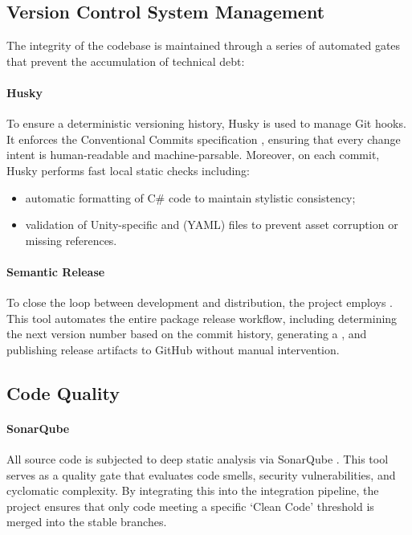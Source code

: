 \subsection{Version Control System Management}

The integrity of the codebase is maintained through a series of automated gates that prevent the accumulation of technical debt:

\paragraph{Husky}
To ensure a deterministic versioning history, Husky \cite{husky} is used to manage Git hooks. It enforces the Conventional Commits specification \cite{conventionalcommits}, ensuring that every change intent is human-readable and machine-parsable. Moreover, on each commit, Husky performs fast local static checks including:

\begin{itemize}
	\item automatic formatting of C\# code to maintain stylistic consistency;
	\item validation of Unity-specific  and  (YAML) files to prevent asset corruption or missing references.
\end{itemize}

\paragraph{Semantic Release}
To close the loop between development and distribution, the project employs  \cite{semanticrelease}. This tool automates the entire package release workflow, including determining the next version number based on the commit history, generating a , and publishing release artifacts to GitHub without manual intervention.

\subsection{Code Quality}

\paragraph{SonarQube}
All source code is subjected to deep static analysis via SonarQube \cite{sonarsource}. This tool serves as a quality gate that evaluates code smells, security vulnerabilities, and cyclomatic complexity. By integrating this into the integration pipeline, the project ensures that only code meeting a specific `Clean Code' threshold is merged into the stable branches.

